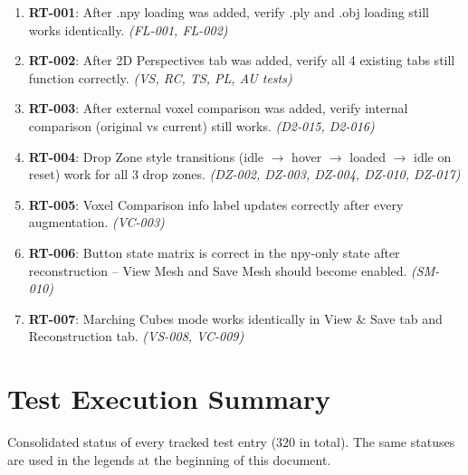 \documentclass[12pt,a4paper]{article}
\begin{document}
\begin{enumerate}[leftmargin=1.5em]
  \item \textbf{RT-001}: After .npy loading was added, verify .ply and .obj loading still works identically. \hfill\textit{(FL-001, FL-002)}
  \item \textbf{RT-002}: After 2D Perspectives tab was added, verify all 4 existing tabs still function correctly. \hfill\textit{(VS, RC, TS, PL, AU tests)}
  \item \textbf{RT-003}: After external voxel comparison was added, verify internal comparison (original vs current) still works. \hfill\textit{(D2-015, D2-016)}
  \item \textbf{RT-004}: Drop Zone style transitions (idle $\rightarrow$ hover $\rightarrow$ loaded $\rightarrow$ idle on reset) work for all 3 drop zones. \hfill\textit{(DZ-002, DZ-003, DZ-004, DZ-010, DZ-017)}
  \item \textbf{RT-005}: Voxel Comparison info label updates correctly after every augmentation. \hfill\textit{(VC-003)}
  \item \textbf{RT-006}: Button state matrix is correct in the npy-only state after reconstruction -- View Mesh and Save Mesh should become enabled. \hfill\textit{(SM-010)}
  \item \textbf{RT-007}: Marching Cubes mode works identically in View \& Save tab and Reconstruction tab. \hfill\textit{(VS-008, VC-009)}
\end{enumerate}

\section{Test Execution Summary}

Consolidated status of every tracked test entry (320 in total).
The same statuses are used in the legends at the beginning of this document.
\end{document}
